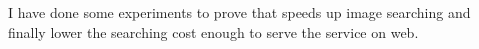 
I have done some experiments to prove that \name{} speeds up image searching and finally lower the searching cost enough to serve the service on web.


